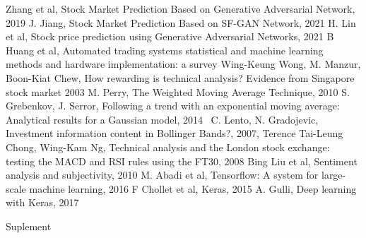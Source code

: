 \documentclass[review]{elsarticle} %
\begin{document}
\begin{thebibliography}{9}
Zhang et al, Stock Market Prediction Based on Generative Adversarial Network, 2019
J. Jiang, Stock Market Prediction Based on SF-GAN Network, 2021
H. Lin et al, Stock price prediction using Generative Adversarial Networks, 2021
B Huang et al, Automated trading systems statistical and machine learning methods and hardware implementation: a survey
Wing-Keung Wong, M. Manzur, Boon-Kiat Chew, How rewarding is technical analysis? Evidence from Singapore stock market 2003
M. Perry, The Weighted Moving Average Technique, 2010
S. Grebenkov, J. Serror, Following a trend with an exponential moving average: Analytical results for a Gaussian model, 2014\
C. Lento, N. Gradojevic, Investment information content in Bollinger Bands?, 2007, 
\bibitem{macd}
Terence Tai-Leung Chong, Wing-Kam Ng, Technical analysis and the London stock exchange: testing the MACD and RSI rules using the FT30, 2008
\bibitem{sentiment}
Bing Liu et al,  Sentiment analysis and subjectivity, 2010
M. Abadi et al, Tensorflow: A system for large-scale machine learning, 2016
\bibitem{keras}
F Chollet et al, Keras, 2015
A. Gulli,  Deep learning with Keras, 2017
\end{thebibliography}

\pagebreak
\hspace{0pt}
\vfill
\begin{center}
\begin{huge}
Suplement
\end{huge}
\end{center}
\vfill
\hspace{0pt}
\pagebreak
\end{document}
